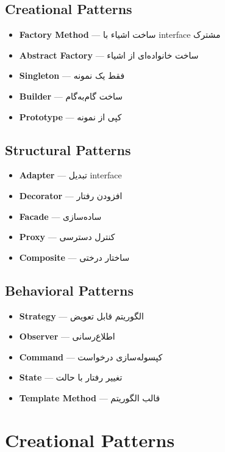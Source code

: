 \documentclass[12pt, a4paper]{article}
\begin{document}
\subsection{Creational Patterns}
\begin{itemize}
    \item \textbf{Factory Method} — ساخت اشیاء با interface مشترک
    \item \textbf{Abstract Factory} — ساخت خانواده‌ای از اشیاء
    \item \textbf{Singleton} — فقط یک نمونه
    \item \textbf{Builder} — ساخت گام‌به‌گام
    \item \textbf{Prototype} — کپی از نمونه
\end{itemize}

\subsection{Structural Patterns}
\begin{itemize}
    \item \textbf{Adapter} — تبدیل interface
    \item \textbf{Decorator} — افزودن رفتار
    \item \textbf{Facade} — ساده‌سازی
    \item \textbf{Proxy} — کنترل دسترسی
    \item \textbf{Composite} — ساختار درختی
\end{itemize}

\subsection{Behavioral Patterns}
\begin{itemize}
    \item \textbf{Strategy} — الگوریتم قابل تعویض
    \item \textbf{Observer} — اطلاع‌رسانی
    \item \textbf{Command} — کپسوله‌سازی درخواست
    \item \textbf{State} — تغییر رفتار با حالت
    \item \textbf{Template Method} — قالب الگوریتم
\end{itemize}

\section{Creational Patterns}
\end{document}
